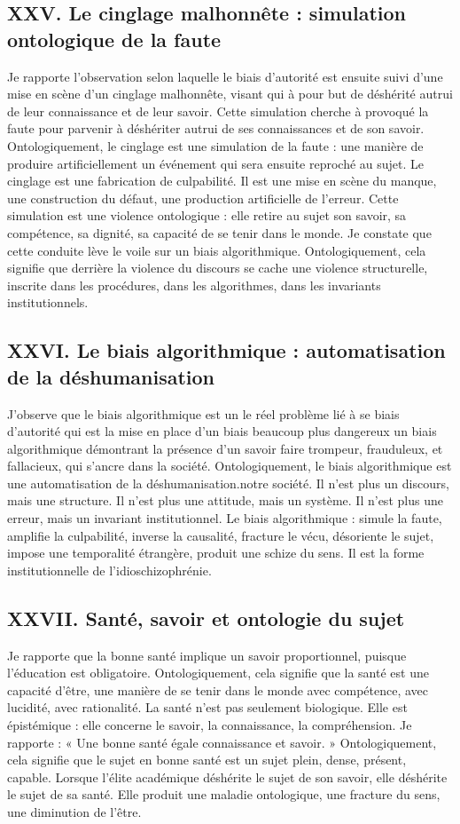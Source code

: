 \documentclass[12pt,a4paper]{article}
\begin{document}
\subsection*{XXV. Le cinglage malhonnête : simulation ontologique de la faute}
Je rapporte l’observation selon laquelle le biais d’autorité est ensuite suivi d’une mise en scène d’un cinglage malhonnête, visant qui à pour but de déshérité autrui de leur connaissance et de leur savoir. Cette simulation cherche à provoqué la faute pour parvenir à déshériter autrui de ses connaissances et de son savoir. Ontologiquement, le cinglage est une simulation de la faute : une manière de produire artificiellement un événement qui sera ensuite reproché au sujet.
Le cinglage est une fabrication de culpabilité. Il est une mise en scène du manque, une construction du défaut, une production artificielle de l’erreur.
Cette simulation est une violence ontologique : elle retire au sujet son savoir, sa compétence, sa dignité, sa capacité de se tenir dans le monde.
Je constate que cette conduite lève le voile sur un biais algorithmique. Ontologiquement, cela signifie que derrière la violence du discours se cache une violence structurelle, inscrite dans les procédures, dans les algorithmes, dans les invariants institutionnels.

\subsection*{XXVI. Le biais algorithmique : automatisation de la déshumanisation}
J’observe que le biais algorithmique est un le réel problème lié à se biais d’autorité qui est la mise en place d’un biais beaucoup plus dangereux un biais algorithmique démontrant la présence d’un savoir  faire trompeur, frauduleux, et fallacieux, qui s’ancre dans la société. Ontologiquement, le biais algorithmique est une automatisation de la déshumanisation.notre société.
Il n’est plus un discours, mais une structure. Il n’est plus une attitude, mais un système. Il n’est plus une erreur, mais un invariant institutionnel.
Le biais algorithmique :
	simule la faute,
	amplifie la culpabilité,
	inverse la causalité,
	fracture le vécu,
	désoriente le sujet,
	impose une temporalité étrangère,
	produit une schize du sens.
Il est la forme institutionnelle de l’idioschizophrénie.

\subsection*{XXVII. Santé, savoir et ontologie du sujet}
Je rapporte que la bonne santé implique un savoir proportionnel, puisque l’éducation est obligatoire. Ontologiquement, cela signifie que la santé est une capacité d’être, une manière de se tenir dans le monde avec compétence, avec lucidité, avec rationalité.
La santé n’est pas seulement biologique. Elle est épistémique : elle concerne le savoir, la connaissance, la compréhension.
Je rapporte :
« Une bonne santé égale connaissance et savoir. »
Ontologiquement, cela signifie que le sujet en bonne santé est un sujet plein, dense, présent, capable.
Lorsque l’élite académique déshérite le sujet de son savoir, elle déshérite le sujet de sa santé. Elle produit une maladie ontologique, une fracture du sens, une diminution de l’être.
\end{document}
